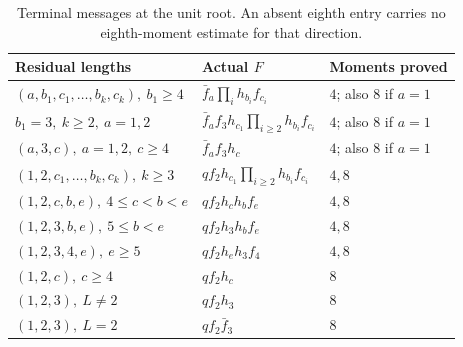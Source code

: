 \begin{table}[htbp]\centering\small
\caption{Terminal messages at the unit root. An absent eighth entry carries no eighth-moment estimate for that direction.}
\label{tab:unit-p:directions}
\begin{tabular}{@{}lll@{}}\toprule
Residual lengths & Actual \(F\) & Moments proved\\\midrule
\((a,b_1,c_1,\ldots,b_k,c_k),\ b_1\ge4\)
 & \(\bar f_a\prod_i h_{b_i}f_{c_i}\) & \(4\); also \(8\) if \(a=1\)\\
\(b_1=3,\ k\ge2,\ a=1,2\)
 & \(\bar f_af_3h_{c_1}\prod_{i\ge2}h_{b_i}f_{c_i}\)
 & \(4\); also \(8\) if \(a=1\)\\
\((a,3,c),\ a=1,2,\ c\ge4\)
 & \(\bar f_af_3h_c\) & \(4\); also \(8\) if \(a=1\)\\
\((1,2,c_1,\ldots,b_k,c_k),\ k\ge3\)
 & \(qf_2h_{c_1}\prod_{i\ge2}h_{b_i}f_{c_i}\) & \(4,8\)\\
\((1,2,c,b,e),\ 4\le c<b<e\)
 & \(qf_2h_ch_bf_e\) & \(4,8\)\\
\((1,2,3,b,e),\ 5\le b<e\)
 & \(qf_2h_3h_bf_e\) & \(4,8\)\\
\((1,2,3,4,e),\ e\ge5\)
 & \(qf_2h_eh_3f_4\) & \(4,8\)\\
\((1,2,c),\ c\ge4\)
 & \(qf_2h_c\) & \(8\)\\
\((1,2,3),\ L\ne2\)
 & \(qf_2h_3\) & \(8\)\\
\((1,2,3),\ L=2\)
 & \(qf_2\bar f_3\) & \(8\)\\\bottomrule
\end{tabular}
\end{table}

